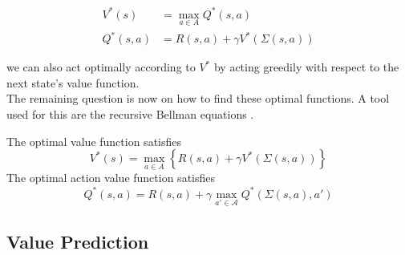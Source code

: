 \begin{align}
V^*(s) &= \max_{a \in A} Q^*(s,a) \\ 
Q^*(s,a) &= R(s,a) + \gamma V^*(\Sigma(s,a))
\end{align}

we can also act optimally according to $V^*$ by acting greedily with respect to the next state's value function.\\

The remaining question is now on how to find these optimal functions. A tool used for this are the recursive Bellman equations \cite{bert07}.
\begin{theorem}
The optimal value function satisfies
\begin{equation}
V^*(s) = \max_{a \in A} \left\{R(s,a) + \gamma V^*(\Sigma(s,a))\right\}
\end{equation}
The optimal action value function satisfies
\begin{equation}
Q^*(s,a) = R(s,a) + \gamma \max_{a'\in \mathcal{A}} Q^*(\Sigma(s,a),a')
\end{equation}
\end{theorem}

\subsection{Value Prediction}
\label{subsec:vp}

